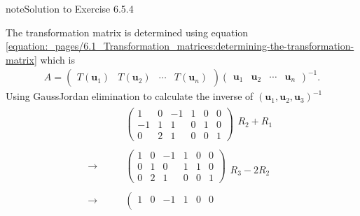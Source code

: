\documentclass[letterpaper,10pt,english]{jupyterBook}
\begin{document}
\begin{sphinxadmonition}{note}{Solution to Exercise 6.5.4}



\sphinxAtStartPar
The transformation matrix is determined using equation \eqref{equation:_pages/6.1_Transformation_matrices:determining-the-transformation-matrix} which is
\begin{equation*}
\begin{split}A = \begin{pmatrix} T(\mathbf{u}_1) & T(\mathbf{u}_2) & \cdots & T(\mathbf{u}_n) \end{pmatrix}
\begin{pmatrix} \mathbf{u}_1 & \mathbf{u}_2 & \cdots & \mathbf{u}_n \end{pmatrix}^{-1}.\end{split}
\end{equation*}
\sphinxAtStartPar
Using Gauss\sphinxhyphen{}Jordan elimination to calculate the inverse of \((\mathbf{u}_1, \mathbf{u}_2, \mathbf{u}_3)^{-1}\)
\begin{equation*}
\begin{split} \begin{align*}
    & \left( \begin{array}{rrr|rrr}
       1 & 0 & -1 & 1 & 0 & 0 \\
       -1 & 1 & 1 & 0 & 1 & 0 \\
       0 & 2 & 1 & 0 & 0 & 1
    \end{array} \right)
    \begin{array}{l} \\ R_2 + R_1 \\ \phantom{x} \end{array} \\ \\ 
    \longrightarrow \qquad 
    & \left( \begin{array}{rrr|rrr}
       1 & 0 & -1 & 1 & 0 & 0 \\
       0 & 1 & 0 & 1 & 1 & 0 \\
       0 & 2 & 1 & 0 & 0 & 1
    \end{array} \right)
    \begin{array}{l} \\ \\ R_3 - 2 R_2 \end{array} \\ \\ 
    \longrightarrow \qquad  
    & \left( \begin{array}{rrr|rrr}
       1 & 0 & -1 & 1 & 0 & 0 \\

\end{array}
\end{align*}
\end{split}
\end{equation*}
\end{sphinxadmonition}
\end{document}
